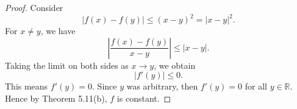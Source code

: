 \begin{Exercise}
	\begin{proof}
		Consider
		$$
		|f(x)-f(y)| \leq (x-y)^2 = |x-y|^2.
		$$
		For $x\neq y$, we have
		$$
		\left| \frac{f(x)-f(y)}{x-y} \right| \leq |x-y|.
		$$
		Taking the limit on both sides as $x\to y$, we obtain
		$$
		|f'(y)| \leq 0.
		$$
		This means $f'(y) = 0$. Since $y$ was arbitrary, then $f'(y) = 0$ for all $y\in\mathbb{R}$. Hence by Theorem 5.11(b), $f$ is constant.
	\end{proof}
\end{Exercise}
